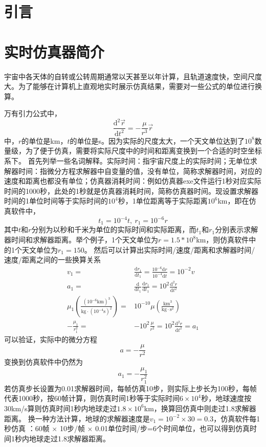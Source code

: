 \section{引\quad 言}


\section{实时仿真器简介}
宇宙中各天体的自转或公转周期通常以天甚至以年计算，且轨道速度快，空间尺度大。为了能够在计算机上直观地实时展示仿真结果，需要对一些公式的单位进行换算。\par
万有引力公式中，
$$\frac{\text{d}^2\vec{r}}{\text{d}t^2}=-\frac{\mu}{r^3}\vec{r}$$
中，$r$的单位是km，$t$的单位是s。因为实际的尺度太大，一个天文单位达到了$10^8$数量级，为了便于仿真，需要将实际尺度中的时间和距离变换到一个合适的时空坐标系下。
首先列举一些名词解释。实际时间：指宇宙尺度上的实际时间；无单位求解器时间：指微分方程求解器中自变量的值，没有单位，简称求解器时间，对应的速度和距离也都没有单位；仿真器消耗时间：例如仿真器exe文件运行1秒对应实际时间的1000秒，此处的1秒就是仿真器消耗时间，简称仿真器时间。现设置求解器时间的1单位时间等于实际时间的$10^4$秒，1单位距离等于实际距离$10^6$km，即在仿真软件中，
$$t_1=10^{-4}t,\ r_1=10^{-6}r$$
其中$t$和$r$分别为以秒和千米为单位的实际时间和实际距离，而$t_1$和$r_1$分别表示求解器时间和求解器距离。举个例子，1个天文单位为$r=1.5*10^8$km，则仿真软件中的1个天文单位为$r_1=150$。
然后可以计算出实际时间/速度/距离和求解器时间/速度/距离之间的一些换算关系
$$\begin{aligned}
v_1 =& \frac{\text{d}r_1}{\text{d}t_1}
 = \frac{10^{-6}\text{d}r}{10^{-4}\text{d}t} = 10^{-2}v \\
a_1 =& \frac{\text{d}}{\text{d}t_1}\frac{\text{d}r_1}{\text{d}t_1}
 = 10^2\frac{\text{d}^2r}{\text{d}t^2} \\
\mu_1(\frac{(10^{-6}\text{km})^3}{\text{kg}\cdot(10^{-4}\text{s})^2})
 =& 10^{-10}\mu(\frac{\text{km}^3}{\text{kg}\cdot \text{s}^2}) \\
-\frac{\mu_1}{r_1^2} =& -10^2\frac{\mu}{r^2} = 10^2\frac{\text{d}^2r}{\text{d}t^2} = a_1
\end{aligned}$$
可以验证，实际中的微分方程
$$a=-\frac{\mu}{r^2}$$
变换到仿真软件中仍然为
$$a_1=-\frac{\mu_1}{r_1^2}$$
若仿真步长设置为0.01求解器时间，每帧仿真10步，则实际上步长为100秒，每帧代表1000秒，按60帧计算，则仿真时间1秒等于实际时间$6\times10^4$秒，地球速度按30km/s算则仿真时间1秒内地球走过$1.8\times10^6$km，换算回仿真中则走过1.8求解器距离。
换一种方法计算，地球的求解器速度是$v_1=10^{-2}\times30=0.3$，仿真软件每1秒仿真 ：60帧 $\times$ 10步/帧 $\times$ 0.01单位时间/步=6个时间单位，也可以得到仿真时间1秒内地球走过1.8求解器距离。

